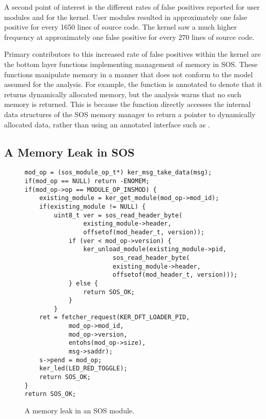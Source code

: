 A second point of interest is the different rates of false positives
reported for user modules and for the kernel.  User modules resulted
in approximately one false positive for every 1650 lines of source
code.  The kernel saw a much higher frequency at approximately one 
false positive for every 270 lines of source code.  

Primary contributors to this increased rate of false positives within
the kernel are the bottom layer functions implementing management of
memory in SOS.  These functions manipulate memory in a manner that
does not conform to the model assumed for the analysis.  For example,
the function  is annotated to denote that
it returns dynamically allocated memory, but the analysis warns that
no such memory is returned.  This is because the function directly
accesses the internal data structures of the SOS memory manager to
return a pointer to dynamically allocated data, rather than using an
annotated interface such as .


%
% 

\subsection{A Memory Leak in SOS}
\label{ss:tale}

\begin{figure}[tp]
\begin{scriptsize}
\begin{verbatim}
mod_op = (sos_module_op_t*) ker_msg_take_data(msg);
if(mod_op == NULL) return -ENOMEM;
if(mod_op->op == MODULE_OP_INSMOD) {
    existing_module = ker_get_module(mod_op->mod_id);
    if(existing_module != NULL) {
        uint8_t ver = sos_read_header_byte(
                existing_module->header,
                offsetof(mod_header_t, version));
            if (ver < mod_op->version) {
                ker_unload_module(existing_module->pid, 
                        sos_read_header_byte(
                        existing_module->header,
                        offsetof(mod_header_t, version)));
            } else {
                return SOS_OK;
            }
        }
    ret = fetcher_request(KER_DFT_LOADER_PID,
            mod_op->mod_id,
            mod_op->version,
            entohs(mod_op->size),
            msg->saddr);
    s->pend = mod_op;
    ker_led(LED_RED_TOGGLE);
    return SOS_OK;
}
return SOS_OK;
\end{verbatim}
\end{scriptsize}
\caption{\label{fig:leak}A memory leak in an SOS module.}
\end{figure}

